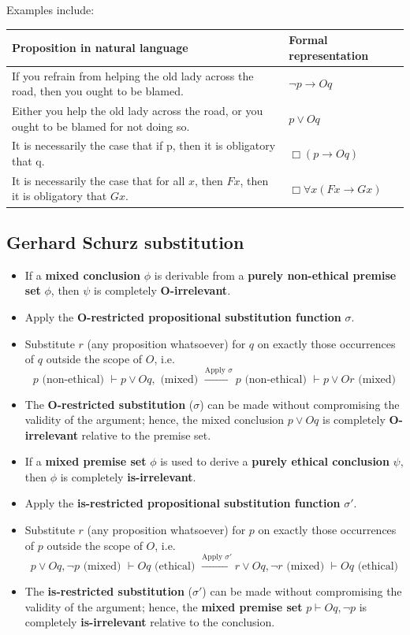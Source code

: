 \documentclass[11pt]{article}
\begin{document}
Examples include:
\begin{center}
\begin{tabular}{|m{25em}|m{5em}|}
\hline
Proposition in natural language & Formal representation\\
\hline
If you refrain from helping the old lady across the road, then you ought to be blamed. & \(\neg p \rightarrow Oq\)\\
\hline
Either you help the old lady across the road, or you ought to be blamed for not doing so. & \(p \vee Oq\)\\
\hline
It is necessarily the case that if p, then it is obligatory that q. & \(\Box (p \rightarrow Oq)\)\\
\hline
It is necessarily the case that for all \(x\), then \(Fx\), then it is obligatory that \(Gx\). & \(\Box \forall x (Fx \rightarrow Gx)\)\\
\hline
\end{tabular}
\end{center}
 \newpage
\subsection{Gerhard Schurz substitution}
\label{sec:orgd57312d}
\begin{itemize}
\item If a \textbf{mixed conclusion} \(\phi\) is derivable from a \textbf{purely non-ethical premise set} \(\phi\), then \(\psi\) is completely \textbf{O-irrelevant}.
\item Apply the \textbf{O-restricted propositional substitution function} \(\sigma\).
\item Substitute \(r\) (any proposition whatsoever) for \(q\) on exactly those occurrences of \(q\) outside the scope of \(O\), i.e.
\[p \text{ (non-ethical) } \vdash p \vee Oq,  \text{ (mixed) } \xrightarrow{\text{Apply } \sigma} p \text{ (non-ethical) } \vdash p \vee Or \text{ (mixed)}\]
\item The \textbf{O-restricted substitution} (\(\sigma\)) can be made without compromising the validity of the argument; hence, the mixed conclusion \(p \vee Oq\) is completely \textbf{O-irrelevant} relative to the premise set.
\item If a \textbf{mixed premise set} \(\phi\) is used to derive a \textbf{purely ethical conclusion} \(\psi\), then \(\phi\) is completely \textbf{is-irrelevant}.
\item Apply the \textbf{is-restricted propositional substitution function} \(\sigma'\).
\item Substitute \(r\) (any proposition whatsoever) for \(p\) on exactly those occurrences of \(p\) outside the scope of \(O\), i.e.
\[p \vee Oq, \neg p \text{ (mixed) } \vdash Oq \text{ (ethical) } \xrightarrow{\text{Apply } \sigma'} r \vee Oq, \neg r \text{ (mixed) } \vdash Oq \text{ (ethical)}\]
\item The \textbf{is-restricted substitution} (\(\sigma'\)) can be made without compromising the validity of the argument; hence, the \textbf{mixed premise set} \(p \vdash Oq, \neg p\) is completely \textbf{is-irrelevant} relative to the conclusion.
\end{itemize}
\end{document}
